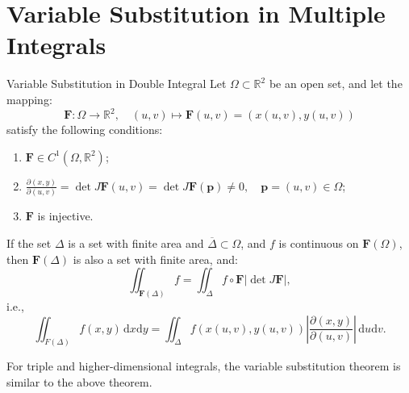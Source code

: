 \documentclass[11pt]{../../TexTemplate/elegantbook}
\begin{document}
\section{Variable Substitution in Multiple Integrals}
\begin{theorem}{Variable Substitution in Double Integral}
    Let \( \Omega \subset \mathbb{R}^2 \) be an open set, and let the mapping:
    \[
    \mathbf{F}: \Omega \to \mathbb{R}^2, \quad (u, v) \mapsto \mathbf{F}(u, v) = (x(u, v), y(u, v))
    \]
    satisfy the following conditions:
    \begin{enumerate}
        \item \( \mathbf{F} \in C^1(\Omega, \mathbb{R}^2) \);
        \item \( \frac{\partial (x, y)}{\partial (u, v)} 
            = \det J\mathbf{F}(u, v) = \det J\mathbf{F}(\mathbf{p}) \neq 0, \quad \mathbf{p} = (u, v) \in \Omega \);
        \item \( \mathbf{F} \) is injective.
    \end{enumerate}

    If the set \( \Delta \) is a set with finite area and 
    \( \overline{\Delta} \subset \Omega \), and \( f \) is continuous on \( \mathbf{F}(\Omega) \), 
    then \( \mathbf{F}(\Delta) \) is also a set with finite area, and:
    \[
    \iint_{\mathbf{F}(\Delta)} f = \iint_{\Delta} f \circ \mathbf{F} \left| \det J\mathbf{F} \right|,
    \]
    i.e.,
    \[
    \iint_{F(\Delta)} f(x, y) \, \mathrm{d}x \mathrm{d}y = 
    \iint_{\Delta} f(x(u, v), y(u, v)) \left| \frac{\partial (x, y)}{\partial (u, v)} \right| \, \mathrm{d}u \mathrm{d}v.
    \]
\end{theorem}

For triple and higher-dimensional integrals, the variable substitution theorem is similar to the above theorem.
\end{document}
